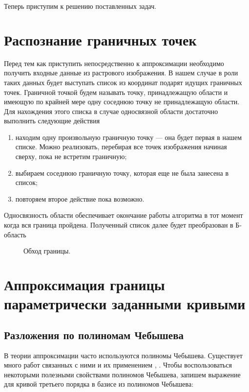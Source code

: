 \documentclass[a4paper,12pt]{report}
\begin{document}
Теперь приступим к решению поставленных задач.

\section{Распознание граничных точек} 
Перед тем как приступить непосредственно к аппроксимации необходимо получить входные данные из растрового изображения. В нашем случае в роли таких данных будет выступать список из координат подарят идущих граничных точек. Граничной точкой будем называть точку, принадлежащую области и имеющую по крайней мере одну соседнюю точку не принадлежащую области. Для нахождения этого списка в случае односвязной области достаточно выполнить следующие действия  
 
\begin{enumerate}
\item находим одну произвольную граничную точку — она будет первая в нашем списке. Можно реализовать, перебирая все точек изображения начиная сверху, пока не встретим граничную;
\item выбираем соседнюю граничную точку, которая еще не была занесена в список;
\item повторяем второе действие пока возможно.
\end{enumerate} 

Односвязность области обеспечивает окончание работы алгоритма в тот момент когда вся граница пройдена. Полученный список далее будет преобразован в Б-область
 
\begin{figure}[h]
\caption{Обход границы.}
\label{ris:border}
\end{figure}

\section{Аппроксимация границы параметрически заданными кривыми}

\subsection{Разложения по полиномам Чебышева}\label{ss:Chebaprox}

В теории аппроксимации часто используются полиномы Чебышева. Существует много работ связанных с ними и их применением \cite{chislmetod}, \cite{numrical analysis}. Чтобы воспользоваться некоторыми полезными свойствами полиномов Чебышева, запишем выражение для кривой третьего порядка в базисе из полиномов Чебышева: 
\end{document}
